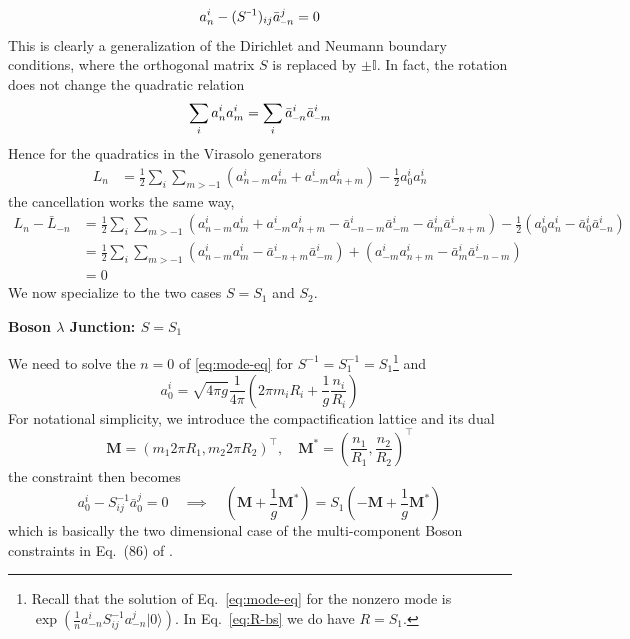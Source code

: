 \documentclass{article}
\renewcommand{\vec}[1]{\boldsymbol{\mathbf{#1}}}
\begin{document}
\begin{equation}
\label{eq:mode-eq}
a_n^i - (S^{\scalebox{0.5}[0.8]{\( - \)}1})_{ij} \bar{a}_{\scalebox{0.6}[0.6]{\( - \)}n}^j = 0
\end{equation}
This is clearly a generalization of the Dirichlet and Neumann boundary conditions, where the orthogonal matrix $S$ is replaced by $\pm \mathbb{I}$. In fact, the rotation does not change the quadratic relation
\begin{equation}
\sum_i a^i_n a^i_m =  \sum_i \bar{a}_{\scalebox{0.6}[0.6]{\( - \)}n}^i \bar{a}_{\scalebox{0.6}[0.6]{\( - \)}m}^i
\end{equation}
Hence for the quadratics in the Virasolo generators
\begin{equation}
\begin{aligned}
L_n &= \frac{1}{2} \sum_i  \sum_{m > -1 } (a^i_{n-m} a^i_m  + a^i_{-m} a^i_{n+m } ) - \frac{1}{2} a^i_0 a^i_n 
\end{aligned}
\end{equation}
the cancellation works the same way,
\begin{equation}
\begin{aligned}
L_n - \bar{L}_{-n} &= \frac{1}{2} \sum_i \sum_{m > -1} ( a^i_{n-m} a^i_m + a^i_{-m} a^i_{n+m} - \bar{a}^i_{-n-m} \bar{a}^i_{-m} - \bar{a}^i_{m} \bar{a}^i_{-n+m }  )  - \frac{1}{2}( a_0^i a_n^i - \bar{a}_0^i \bar{a}^i _{-n})\\
& = \frac{1}{2} \sum_i \sum_{m > -1} ( a^i_{n-m} a^i_m  - \bar{a}^i_{-n+m}\bar{a}^i_{-m})+ (a^i_{-m} a^i_{n+m} - \bar{a}^i_{m} \bar{a}^i_{-n -m }  )\\
& = 0 
\end{aligned}
\end{equation}
We now specialize to the two cases $S = S_1$ and $S_2$. 

{\bf Boson $\lambda$ Junction: $S = S_1$}

We need to solve the $n = 0$ of \eqref{eq:mode-eq} for $S^{-1} = S_1^{-1} = S_1$\footnote{Recall that the solution of Eq.~\eqref{eq:mode-eq} for the nonzero mode is $\exp(\frac{1}{n} a_{-n}^{i} S^{-1}_{ij} a_{-n}^j |0\rangle)$. In Eq.~\eqref{eq:R-bs} we do have $R = S_1$. } and
\begin{equation}
a^i_0 = \sqrt{4\pi g}  \frac{1}{4\pi} (2\pi m_i R_i + \frac{1}{g} \frac{n_i}{R_i})
\end{equation}
For notational simplicity, we introduce the compactification lattice and its dual\cite{oshikawa_boundary_2010}
\begin{equation}
\label{eq:lattice}
\vec{M} = (m_1 2 \pi R_1, m_2 2\pi  R_2)^\top, \quad  \vec{M}^* = (\frac{n_1}{R_1}, \frac{n_2}{R_2})^\top
\end{equation}
the constraint then becomes 
\begin{equation}
  a_0^i - S^{-1} _{ij} \bar{a}_{0}^j = 0 \quad \implies \quad ( \vec{M} + \frac{1}{g}\vec{M}^* ) = S_1 ( -\vec{M} + \frac{1}{g}\vec{M}^* )
\end{equation}
which is basically the two dimensional case of the multi-component Boson constraints in Eq.~(86) of \cite{oshikawa_boundary_2010}. 
\end{document}
